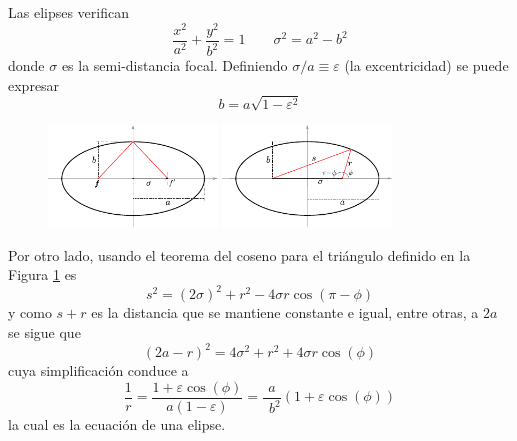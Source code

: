 \documentclass[10pt,oneside]{CBFT_book}
\begin{document}
Las elipses verifican 
\[
	\frac{x^2}{a^2} + \frac{y^2}{b^2} = 1	\qquad \sigma^2 = a^2 - b^2
\]
donde $\sigma$ es la semi-distancia focal. Definiendo $ \sigma/a \equiv \varepsilon$ (la excentricidad) 
se puede expresar
\[
	b = a \sqrt{ 1 - \varepsilon^2 }
\]
\begin{figure}[hbt]
	\begin{center}
	\includegraphics[width=0.4\textwidth]{images/fig_mc_elipse_1.pdf} \hspace*{2em}	 
	\includegraphics[width=0.4\textwidth]{images/fig_mc_elipse.pdf}	 
	\end{center}
	\caption{}
	\label{fig_mc_elipse}
\end{figure} 

Por otro lado, usando el teorema del coseno para el triángulo definido en la Figura \ref{fig_mc_elipse} es 
\[
	s^2 = (2\sigma)^2 + r^2 - 4\sigma r \cos( \pi - \phi )
\]
y como $s+r$ es la distancia que se mantiene constante e igual, entre otras, a $2a$ se sigue que 
\[
	( 2a -r )^2 = 4\sigma^2 + r^2 + 4\sigma r \cos(\phi)
\]
cuya simplificación conduce a
\[
	\frac{1}{r} = \frac{1 + \varepsilon \cos (\phi)}{a(1-\varepsilon)} = \frac{a}{\phantom{^a}b^2} \left( 1 + 
\varepsilon \cos (\phi) \right)
\]
la cual es la ecuación de una elipse.

\end{document}
